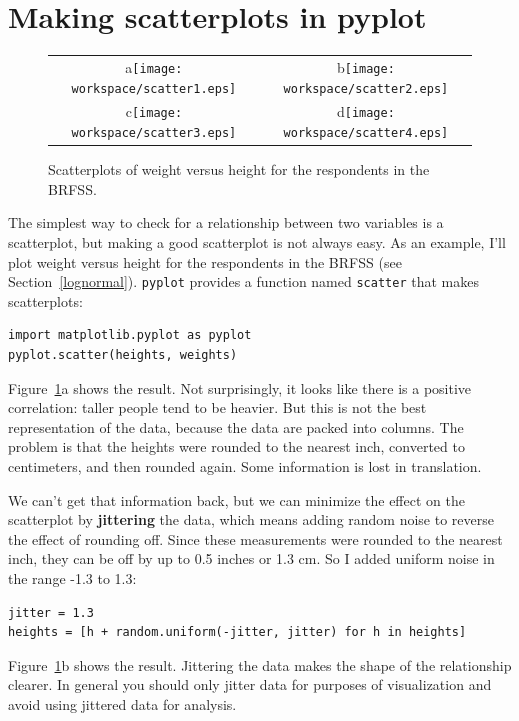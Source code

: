 \documentclass[12pt]{book}
\begin{document}
\section{Making scatterplots in pyplot}

\begin{figure}
\centering
\begin{tabular}{cc}
a\texttt{[image: workspace/scatter1.eps]} &
b\texttt{[image: workspace/scatter2.eps]} \\
c\texttt{[image: workspace/scatter3.eps]} &
d\texttt{[image: workspace/scatter4.eps]} \\ 
\end{tabular}
\caption{Scatterplots of weight versus height for the respondents
in the BRFSS.}
\label{scatterplots}
\end{figure}

The simplest way to check for a relationship between two variables
is a scatterplot, but making a good scatterplot is not always easy.
As an example, I'll plot weight versus height for the respondents
in the BRFSS (see Section~\ref{lognormal}).  {\tt pyplot} provides
a function named {\tt scatter} that makes scatterplots:

\begin{verbatim}
import matplotlib.pyplot as pyplot
pyplot.scatter(heights, weights)
\end{verbatim}

Figure~\ref{scatterplots}a shows the result.  Not surprisingly, it
looks like there is a positive correlation: taller people tend to be
heavier.  But this is not the best representation of the data, because
the data are packed into columns.  The problem is that the heights
were rounded to the nearest inch, converted to centimeters, and
then rounded again.  Some information is lost in translation.

We can't get that information back, but we can minimize the effect on
the scatterplot by {\bf jittering} the data, which means adding random
noise to reverse the effect of rounding off.  Since these measurements
were rounded to the nearest inch, they can be off by up to 0.5 inches or
1.3 cm.  So I added uniform noise in the range -1.3 to 1.3:

\begin{verbatim}
jitter = 1.3
heights = [h + random.uniform(-jitter, jitter) for h in heights]
\end{verbatim}

Figure~\ref{scatterplots}b shows the result.  Jittering the data makes
the shape of the relationship clearer.  In general you should only jitter
data for purposes of visualization and avoid using jittered data
for analysis.
\end{document}
